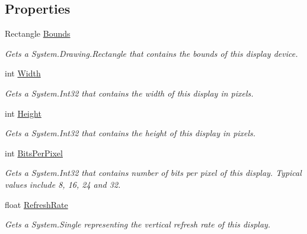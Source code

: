 \subsection*{Properties}
\begin{DoxyCompactItemize}
\item 
Rectangle \hyperlink{class_open_t_k_1_1_display_resolution_aa413eee2359d6426fbcec8280fce9c29}{Bounds}
\begin{DoxyCompactList}\small\item\em Gets a System.\-Drawing.\-Rectangle that contains the bounds of this display device. \end{DoxyCompactList}\item 
int \hyperlink{class_open_t_k_1_1_display_resolution_ae2f5a42e23f49e4c1fd3c67714b9a259}{Width}
\begin{DoxyCompactList}\small\item\em Gets a System.\-Int32 that contains the width of this display in pixels.\end{DoxyCompactList}\item 
int \hyperlink{class_open_t_k_1_1_display_resolution_a2a507b345a19dec923c9e14f6b003bd5}{Height}
\begin{DoxyCompactList}\small\item\em Gets a System.\-Int32 that contains the height of this display in pixels.\end{DoxyCompactList}\item 
int \hyperlink{class_open_t_k_1_1_display_resolution_a7f719af2b3dc6db3533ccd335235c7b1}{Bits\-Per\-Pixel}
\begin{DoxyCompactList}\small\item\em Gets a System.\-Int32 that contains number of bits per pixel of this display. Typical values include 8, 16, 24 and 32.\end{DoxyCompactList}\item 
float \hyperlink{class_open_t_k_1_1_display_resolution_a5d661a58b45850d6f55dbda121598b89}{Refresh\-Rate}
\begin{DoxyCompactList}\small\item\em Gets a System.\-Single representing the vertical refresh rate of this display. \end{DoxyCompactList}\end{DoxyCompactItemize}


